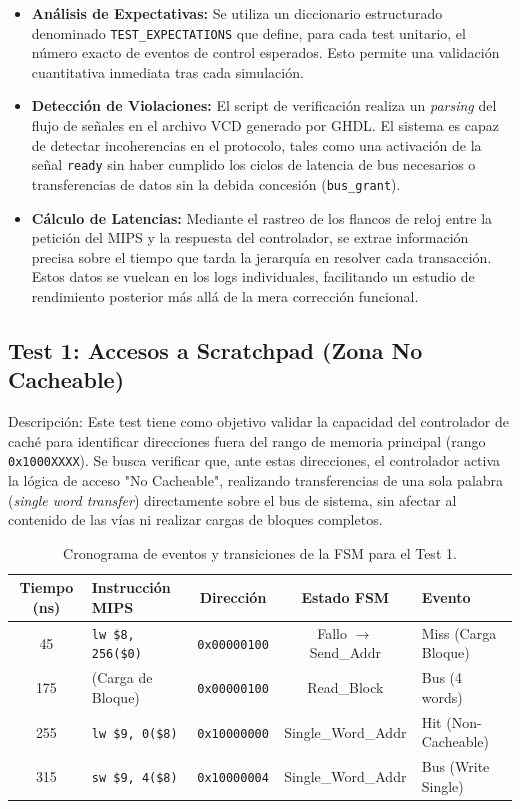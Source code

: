 \documentclass[12pt,a4paper]{article}
\begin{document}
\begin{itemize}
    \item \textbf{Análisis de Expectativas:} Se utiliza un diccionario estructurado denominado \texttt{TEST\_EXPECTATIONS} que define, para cada test unitario, el número exacto de eventos de control esperados. Esto permite una validación cuantitativa inmediata tras cada simulación.
    \item \textbf{Detección de Violaciones:} El script de verificación realiza un \textit{parsing} del flujo de señales en el archivo VCD generado por GHDL. El sistema es capaz de detectar incoherencias en el protocolo, tales como una activación de la señal \texttt{ready} sin haber cumplido los ciclos de latencia de bus necesarios o transferencias de datos sin la debida concesión (\texttt{bus\_grant}).
    \item \textbf{Cálculo de Latencias:} Mediante el rastreo de los flancos de reloj entre la petición del MIPS y la respuesta del controlador, se extrae información precisa sobre el tiempo que tarda la jerarquía en resolver cada transacción. Estos datos se vuelcan en los logs individuales, facilitando un estudio de rendimiento posterior más allá de la mera corrección funcional.
\end{itemize}

    \subsection{Test 1: Accesos a Scratchpad (Zona No Cacheable)}

Descripción: Este test tiene como objetivo validar la capacidad del controlador de caché para identificar direcciones fuera del rango de memoria principal (rango \texttt{0x1000XXXX}). Se busca verificar que, ante estas direcciones, el controlador activa la lógica de acceso "No Cacheable", realizando transferencias de una sola palabra (\textit{single word transfer}) directamente sobre el bus de sistema, sin afectar al contenido de las vías ni realizar cargas de bloques completos.

\begin{table}[H]
\centering
\small
\begin{tabular}{|c|l|c|c|l|}
\hline
\textbf{Tiempo (ns)} & \textbf{Instrucción MIPS} & \textbf{Dirección} & \textbf{Estado FSM} & \textbf{Evento} \\ \hline
45  & \texttt{lw \$8, 256(\$0)}  & \texttt{0x00000100} & Fallo $\rightarrow$ Send\_Addr & Miss (Carga Bloque) \\ \hline
175 & (Carga de Bloque)          & \texttt{0x00000100} & Read\_Block           & Bus (4 words)       \\ \hline
255 & \texttt{lw \$9, 0(\$8)}    & \texttt{0x10000000} & Single\_Word\_Addr    & Hit (Non-Cacheable) \\ \hline
315 & \texttt{sw \$9, 4(\$8)}    & \texttt{0x10000004} & Single\_Word\_Addr    & Bus (Write Single)  \\ \hline
\end{tabular}
\caption{Cronograma de eventos y transiciones de la FSM para el Test 1.}
\end{table}
\end{document}
